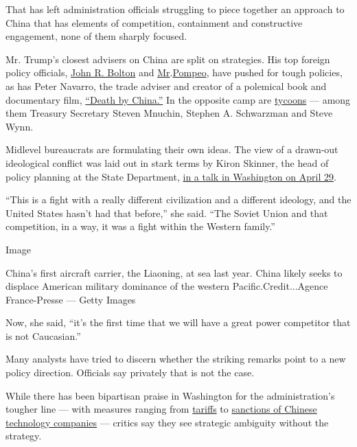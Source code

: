 That has left administration officials struggling to piece together an
approach to China that has elements of competition, containment and
constructive engagement, none of them sharply focused.

Mr. Trump's closest advisers on China are split on strategies. His top
foreign policy officials,
\href{https://www.nytimes3xbfgragh.onion/2019/05/28/us/politics/trump-john-bolton-north-korea-iran.html}{John
R. Bolton} and
\href{https://www.nytimes3xbfgragh.onion/2019/06/22/world/middleeast/trump-pompeo-iran.html}{Mr}.\href{https://www.nytimes3xbfgragh.onion/2019/06/22/world/middleeast/trump-pompeo-iran.html}{Pompeo},
have pushed for tough policies, as has Peter Navarro, the trade adviser
and creator of a polemical book and documentary film,
\href{http://deathbychina.com/}{``Death by China.''} In the opposite
camp are
\href{https://www.nytimes3xbfgragh.onion/2018/10/24/us/politics/trump-phone-security.html}{tycoons}
--- among them Treasury Secretary Steven Mnuchin, Stephen A. Schwarzman
and Steve Wynn.

Midlevel bureaucrats are formulating their own ideas. The view of a
drawn-out ideological conflict was laid out in stark terms by Kiron
Skinner, the head of policy planning at the State Department,
\href{https://www.washingtonexaminer.com/policy/defense-national-security/state-department-preparing-for-clash-of-civilizations-with-china}{in
a talk in Washington on April 29}.

``This is a fight with a really different civilization and a different
ideology, and the United States hasn't had that before,'' she said.
``The Soviet Union and that competition, in a way, it was a fight within
the Western family.''

Image

China's first aircraft carrier, the Liaoning, at sea last year. China
likely seeks to displace American military dominance of the western
Pacific.Credit...Agence France-Presse --- Getty Images

Now, she said, ``it's the first time that we will have a great power
competitor that is not Caucasian.''

Many analysts have tried to discern whether the striking remarks point
to a new policy direction. Officials say privately that is not the case.

While there has been bipartisan praise in Washington for the
administration's tougher line --- with measures ranging from
\href{https://www.nytimes3xbfgragh.onion/2019/05/09/us/politics/china-trade-tariffs.html}{tariffs}
to
\href{https://www.nytimes3xbfgragh.onion/2019/05/15/business/huawei-ban-trump.html}{sanctions
of Chinese technology companies} --- critics say they see strategic
ambiguity without the strategy.

